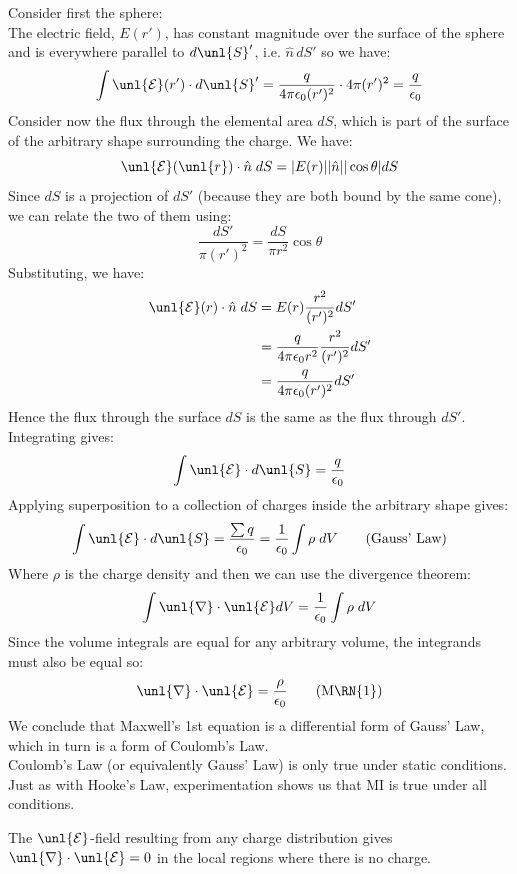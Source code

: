 \documentclass[a4paper, 11pt, normalem]{report}
\newcommand\E{\mathcal{E}}
\newcommand\uE{\unl{\E}}
\newcommand\del{\unl{\nabla}}
\newcommand\eno{\epsilon_0}
\newcommand\hn{\hat{n}}
\begin{document}
Consider first the sphere: \\
The electric field, $E(r')$, has constant magnitude over the surface of the sphere and is everywhere parallel to $d\unl{S}'$, i.e. $\hn\,dS'$ so we have:
\begin{equation*}
    \int \uE(r') \cdot d\unl{S}' = \frac{q}{4\pi\eno(r')^2}\cdot 4\pi(r')^2 = \frac{q}{\eno}
\end{equation*}
Consider now the flux through the elemental area $dS$, which is part of the surface of the arbitrary shape surrounding the charge.
We have:
\begin{equation*}
    \uE(\unl{r})\cdot \hn\;dS = |E(r)||\hn||\cos\theta|dS
\end{equation*}
Since $dS$ is a projection of $dS'$ (because they are both bound by the same cone), we can relate the two of them using:
\begin{equation*}
    \frac{dS'}{\pi(r')^2} = \frac{dS}{\pi r^2}\cos\theta
\end{equation*}
Substituting, we have:
\begin{align*}
    \uE(r)\cdot\hn\;dS &= E(r)\frac{r^2}{(r')^2}dS' \\
    &= \frac{q}{4\pi\eno r^2}\frac{r^2}{(r')^2} dS' \\
    &= \frac{q}{4\pi\eno(r')^2}dS'
\end{align*}
Hence the flux through the surface $dS$ is the same as the flux through $dS'$. \\
Integrating gives:
\begin{equation*}
    \int \uE\cdot d\unl{S} = \frac{q}{\eno}
\end{equation*}
Applying superposition to a collection of charges inside the arbitrary shape gives:
\begin{equation}
    \int \uE\cdot d\unl{S} = \frac{\sum q}{\eno} = \frac{1}{\eno}\int \rho\;dV \tag{Gauss' Law}
\end{equation}
Where $\rho$ is the charge density and then we can use the divergence theorem:
\begin{equation*}
    \int \del \cdot \uE dV = \frac{1}{\eno} \int \rho\;dV
\end{equation*}
Since the volume integrals are equal for any arbitrary volume, the integrands must also be equal so:
\begin{equation*}
    \del \cdot \uE = \frac{\rho}{\eno} \tag{M\RN{1}}
\end{equation*}
We conclude that Maxwell's 1st equation is a differential form of Gauss' Law, which in turn is a form of Coulomb's Law. \\
Coulomb's Law (or equivalently Gauss' Law) is only true under static conditions.
Just as with Hooke's Law, experimentation shows us that M\RN{1} is true under all conditions.

The $\uE$-field resulting from any charge distribution gives $\del \cdot \uE = 0$ in the local regions where there is no charge.
\end{document}
